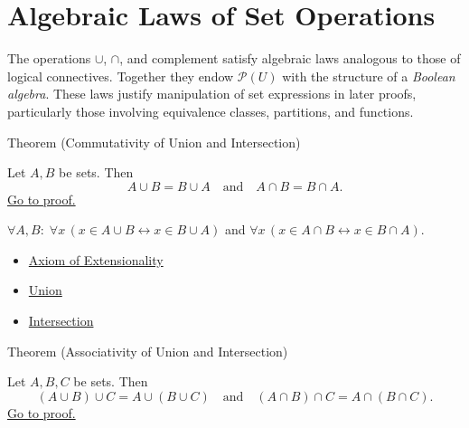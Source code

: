 
\section{Algebraic Laws of Set Operations}


\begin{remark*}
The operations $\cup$, $\cap$, and complement satisfy algebraic laws analogous
to those of logical connectives. Together they endow $\mathcal{P}(U)$ with
the structure of a \emph{Boolean algebra}. These laws justify manipulation
of set expressions in later proofs, particularly those involving equivalence
classes, partitions, and functions.
\end{remark*}

\begin{theorembox}{Theorem (Commutativity of Union and Intersection)}
\begin{theorem}\label{thm:commutativity}
Let $A,B$ be sets. Then
\[
A \cup B = B \cup A
\quad\text{and}\quad
A \cap B = B \cap A.
\]
\hyperref[prf:commutativity]{Go to proof.}
\end{theorem}
\end{theorembox}

\begin{remark*}
$\forall A, B:\; \forall x\,(x \in A \cup B \leftrightarrow x \in B \cup A)$ and $\forall x\,(x \in A \cap B \leftrightarrow x \in B \cap A)$.
\end{remark*}

\begin{dependencies}
\begin{itemize}
  \item \hyperref[ax:extensionality]{Axiom of Extensionality}
  \item \hyperref[def:union]{Union}
  \item \hyperref[def:intersection]{Intersection}
\end{itemize}
\end{dependencies}

\begin{theorembox}{Theorem (Associativity of Union and Intersection)}
\begin{theorem}\label{thm:associativity}
Let $A,B,C$ be sets. Then
\[
(A \cup B) \cup C = A \cup (B \cup C)
\quad\text{and}\quad
(A \cap B) \cap C = A \cap (B \cap C).
\]
\hyperref[prf:associativity]{Go to proof.}
\end{theorem}
\end{theorembox}

